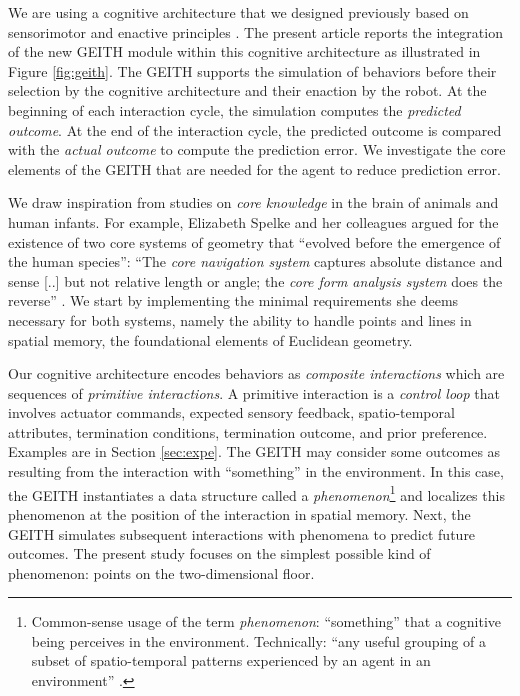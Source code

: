 \documentclass[runningheads]{llncs}
\begin{document}
We are using a cognitive architecture that we designed previously based on sensorimotor and enactive principles \cite{georgeon_artificial_2024}. 
The present article reports the integration of the new GEITH module within this cognitive architecture as illustrated in Figure \ref{fig:geith}. 
The GEITH supports the simulation of behaviors before their selection by the cognitive architecture and their enaction by the robot. 
At the beginning of each interaction cycle, the simulation computes the \textit{predicted outcome}.
At the end of the interaction cycle, the predicted outcome is compared with the \textit{actual outcome} to compute the prediction error.   
We investigate the core elements of the GEITH that are needed for the agent to reduce prediction error. 

We draw inspiration from studies on \textit{core knowledge} in the brain of animals and human infants. 
For example, Elizabeth Spelke and her colleagues argued for the existence of two core systems of geometry that ``evolved before the emergence of the human species'':  
``The \textit{core navigation system} captures absolute distance and sense [..] but not relative length or angle; the \textit{core form analysis system} does the reverse'' \cite[p. 2789]{spelke_core_2012}.
We start by implementing the minimal requirements she deems necessary for both systems, namely the ability to handle points and lines in spatial memory, the foundational elements of Euclidean geometry. 

Our cognitive architecture encodes behaviors as \textit{composite interactions} which are sequences of \textit{primitive interactions}.
A primitive interaction is a \textit{control loop} that involves actuator commands, expected sensory feedback, spatio-temporal attributes, termination conditions, termination outcome, and prior preference. 
Examples are in Section \ref{sec:expe}. 
The GEITH may consider some outcomes as resulting from the interaction with ``something'' in the environment.
In this case, the GEITH instantiates a data structure called a \textit{phenomenon}\footnote{Common-sense usage of the term \textit{phenomenon}: ``something'' that a cognitive being perceives in the environment. Technically: ``any useful grouping of a subset of spatio-temporal patterns experienced by an agent in an environment'' \cite[p. 8]{thorisson_explanation_2021}.} and localizes this phenomenon at the position of the interaction in spatial memory.
Next, the GEITH simulates subsequent interactions with phenomena to predict future outcomes. 
The present study focuses on the simplest possible kind of phenomenon: points on the two-dimensional floor.
\end{document}

